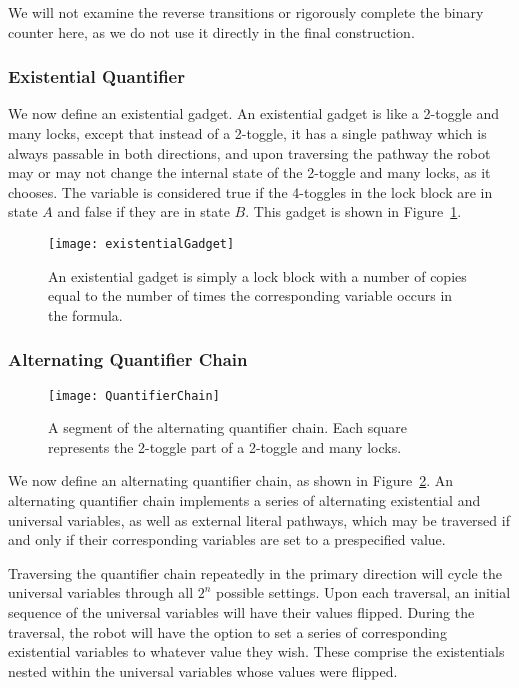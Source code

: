 We will not examine the reverse transitions or rigorously complete the binary counter here, 
as we do not use it directly in the final construction. 

\subsubsection{Existential Quantifier}
We now define an existential gadget. An existential gadget is like a 2-toggle and many locks, except that instead of a
2-toggle, it has a single pathway which is always passable in both directions, and upon traversing the pathway
the robot may or may not change the internal state of the 2-toggle and many locks, as it chooses. The variable is 
considered true if the 4-toggles in the lock block are in state $A$ and false if they are in state $B$. This gadget
is shown in Figure~\ref{fig:Existential}.

\begin{figure}[h!]
\centering
    \texttt{[image: existentialGadget]}
    \caption{An existential gadget is simply a lock block with a number of copies equal to the number of times the corresponding variable occurs in the formula.}
    \label{fig:Existential}
\end{figure}


\subsubsection{Alternating Quantifier Chain}
\begin{figure}[h!]
\centering
    \texttt{[image: QuantifierChain]}
    \caption{A segment of the alternating quantifier chain. Each square represents the 2-toggle part of a 2-toggle and many locks.}
    \label{fig:QuantifierChain}
\end{figure}

We now define an alternating quantifier chain, as shown in Figure~\ref{fig:QuantifierChain}. An alternating quantifier chain implements a series of
alternating existential and universal variables, as well as external literal pathways, which may be traversed
if and only if their corresponding variables are set to a prespecified value.

Traversing the quantifier chain
repeatedly in the primary direction will cycle the universal variables through all $2^n$ possible settings.
Upon each traversal, an initial sequence of the universal variables will have their values flipped.
During the traversal, the robot will have the option to set a series of corresponding existential variables to whatever value they wish. These comprise the existentials nested within the universal variables whose values were flipped.

